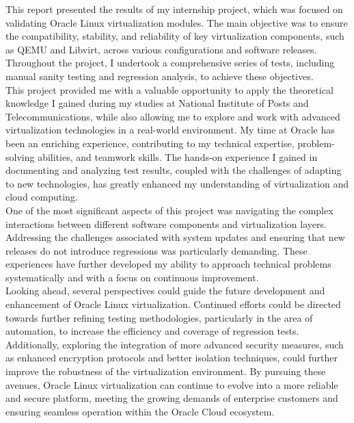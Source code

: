 This report presented the results of my internship project, which was focused on validating Oracle Linux virtualization modules. The main objective was to ensure the compatibility, stability, and reliability of key virtualization components, such as QEMU and Libvirt, across various configurations and software releases. Throughout the project, I undertook a comprehensive series of tests, including manual sanity testing and regression analysis, to achieve these objectives. \\

This project provided me with a valuable opportunity to apply the theoretical knowledge I gained during my studies at National Institute of Posts and Telecommunications, while also allowing me to explore and work with advanced virtualization technologies in a real-world environment. My time at Oracle has been an enriching experience, contributing to my technical expertise, problem-solving abilities, and teamwork skills. The hands-on experience I gained in documenting and analyzing test results, coupled with the challenges of adapting to new technologies, has greatly enhanced my understanding of virtualization and cloud computing. \\

One of the most significant aspects of this project was navigating the complex interactions between different software components and virtualization layers. Addressing the challenges associated with system updates and ensuring that new releases do not introduce regressions was particularly demanding. These experiences have further developed my ability to approach technical problems systematically and with a focus on continuous improvement. \\

Looking ahead, several perspectives could guide the future development and enhancement of Oracle Linux virtualization. Continued efforts could be directed towards further refining testing methodologies, particularly in the area of automation, to increase the efficiency and coverage of regression tests. Additionally, exploring the integration of more advanced security measures, such as enhanced encryption protocols and better isolation techniques, could further improve the robustness of the virtualization environment. By pursuing these avenues, Oracle Linux virtualization can continue to evolve into a more reliable and secure platform, meeting the growing demands of enterprise customers and ensuring seamless operation within the Oracle Cloud ecosystem.